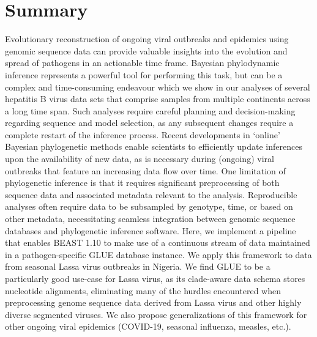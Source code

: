 \chapter{Summary}                                 
\label{ch:summary}

Evolutionary reconstruction of ongoing viral outbreaks and epidemics using genomic sequence data can provide valuable insights into the evolution and spread of pathogens in an actionable time frame. %
Bayesian phylodynamic inference represents a powerful tool for performing this task, but can be a complex and time-consuming endeavour which we show in our analyses of several hepatitis B virus data sets that comprise samples from multiple continents across a long time span.
Such analyses require careful planning and decision-making regarding sequence and model selection, as any subsequent changes require a complete restart of the inference process.
Recent developments in ‘online’ Bayesian phylogenetic methods enable scientists to efficiently update inferences upon the availability of new data, as is necessary during (ongoing) viral outbreaks that feature an increasing data flow over time.
One limitation of phylogenetic inference is that it requires significant preprocessing of both sequence data and associated metadata relevant to the analysis.
Reproducible analyses often require data to be subsampled by genotype, time, or based on other metadata, necessitating seamless integration between genomic sequence databases and phylogenetic inference software.
Here, we implement a pipeline that enables BEAST 1.10 to make use of a continuous stream of data maintained in a pathogen-specific GLUE database instance.
We apply this framework to data from seasonal Lassa virus outbreaks in Nigeria.
We find GLUE to be a particularly good use-case for Lassa virus, as its clade-aware data schema stores nucleotide alignments, eliminating many of the hurdles encountered when preprocessing genome sequence data derived from Lassa virus and other highly diverse segmented viruses. %
We also propose generalizations of this framework for other ongoing viral epidemics (COVID-19, seasonal influenza, measles, etc.).


\cleardoublepage

